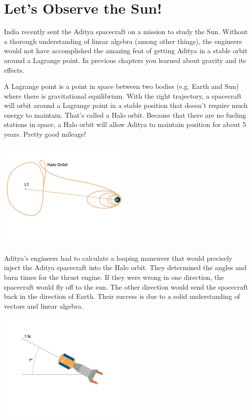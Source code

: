 \section{Let's Observe the Sun!}
India recently sent the Aditya spacecraft on a mission to study the Sun. Without a thorough understanding of linear algebra (among other things), the engineers would not have accomplished the amazing feat of getting Aditya in a stable orbit around a Lagrange point. In previous chapters you learned about gravity and its effects. 

A Lagrange point is a point in space between two bodies (e.g. Earth and Sun) where there is gravitational equilibrium. With the right trajectory, a spacecraft will orbit around a Lagrange point in a stable position that doesn’t require much energy to maintain. That’s called a Halo orbit. Because that there are no fueling stations in space, a Halo orbit will allow Aditya to maintain position for about 5 years. Pretty good mileage!

\includegraphics[width=0.5\textwidth]{orbit.png}

Aditya’s engineers had to calculate a looping maneuver that would precisely inject the Aditya spacecraft into the Halo orbit. They determined the angles and burn times for the thrust engine. If they were wrong in one direction, the spacecraft would fly off to the sun. The other direction would send the spacecraft back in the direction of Earth. Their success is due to a solid understanding of vectors and linear algebra.

\includegraphics[width=0.5\textwidth]{thrust.png}

